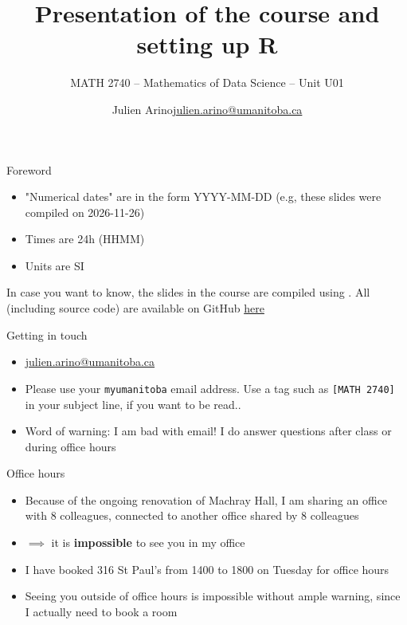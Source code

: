 \documentclass[aspectratio=169]{beamer}\usepackage[]{graphicx}\usepackage[]{xcolor}
\subtitle{MATH 2740 -- Mathematics of Data Science -- Unit U01}
\author{\texorpdfstring{Julien Arino\newline\url{julien.arino@umanitoba.ca}}{Julien Arino}}
\institute{Department of Mathematics @ University of Manitoba}
\title{Presentation of the course and setting up R}
\begin{document}


\SStitlepage
\SSoutlinepage



\begin{frame}{Foreword}
\begin{itemize}
\item "Numerical dates" are in the form YYYY-MM-DD (e.g, these slides were compiled on 2026-11-26)
\vfill
\item Times are 24h (HHMM)
\vfill
\item Units are SI
\end{itemize}
\vfill
In case you want to know, the slides in the course are  compiled using . All (including source code) are available on GitHub \href{https://github.com/julien-arino/math2740-of-data-science}{here}
\end{frame}

\begin{frame}{Getting in touch}
\begin{itemize}
\item \href{mailto:julien.arino@umanitoba.ca}{julien.arino@umanitoba.ca}
\vfill
\item Please use your \texttt{myumanitoba} email address. Use a tag such as \texttt{[MATH 2740]} in your subject line, if you want to be read..
\vfill
\item Word of warning: I am bad with email! I do answer questions after class or during office hours
\end{itemize}
\end{frame}

\begin{frame}{Office hours}
\begin{itemize}
\item Because of the ongoing renovation of Machray Hall, I am sharing an office with 8 colleagues, connected to another office shared by 8 colleagues
\vfill
\item $\implies$ it is \textbf{impossible} to see you in my office
\vfill
\item I have booked 316 St Paul's from 1400 to 1800 on Tuesday for office hours
\vfill
\item Seeing you outside of office hours is impossible without ample warning, since I actually need to book a room
\end{itemize}
\end{frame}
\end{document}
